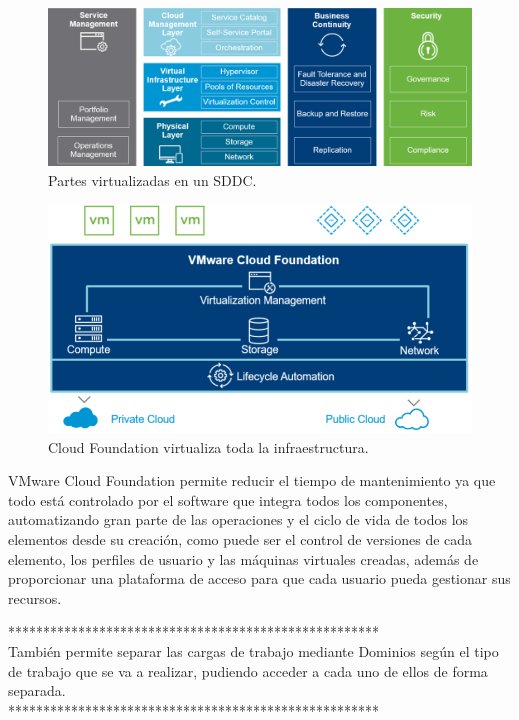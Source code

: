 \begin{figure}[h!]
  \centering
  \includegraphics[width=1\textwidth]{imaxes/cap2recursos/SDDCoverview.png}
  \caption{Partes virtualizadas en un SDDC.}
  \label{fig:sddcoverview}
\end{figure}

\begin{figure}[h!]
  \centering
  \includegraphics[width=1\textwidth]{imaxes/cap2recursos/overviewCF.png}
  \caption{Cloud Foundation virtualiza toda la infraestructura.}
  \label{fig:infraCloudFound}
\end{figure}
\FloatBarrier

VMware Cloud Foundation permite reducir el tiempo de mantenimiento ya que todo está controlado por el software que integra todos los componentes, automatizando gran parte de las operaciones y el ciclo de vida de todos los elementos desde su creación, como puede ser el control de versiones de cada elemento, los perfiles de usuario y las máquinas virtuales creadas, además de proporcionar una plataforma de acceso para que cada usuario pueda gestionar sus recursos.

*****************************************************\\
También permite separar las cargas de trabajo mediante Dominios según el tipo de trabajo que se va a realizar, pudiendo acceder a cada uno de ellos de forma separada.\\
*****************************************************\\


